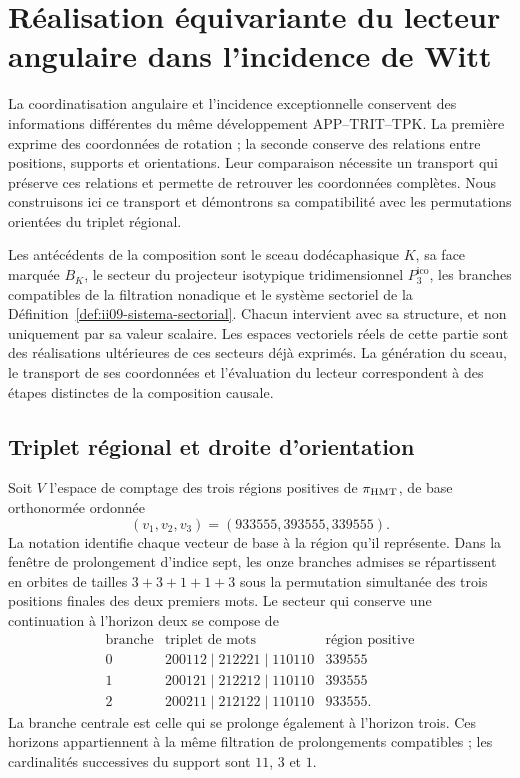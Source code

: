 \section{Réalisation équivariante du lecteur angulaire dans l’incidence de Witt}
\label{sec:ii-enlace-angular-witt}

La coordinatisation angulaire et l’incidence exceptionnelle conservent des informations différentes
du même développement APP--TRIT--TPK. La première exprime des coordonnées de
rotation ; la seconde conserve des relations entre positions, supports et
orientations. Leur comparaison nécessite un transport qui préserve ces
relations et permette de retrouver les coordonnées complètes. Nous construisons ici
ce transport et démontrons sa compatibilité avec les permutations
orientées du triplet régional.

Les antécédents de la composition sont le sceau dodécaphasique \(K\), sa
face marquée \(B_K\), le secteur du projecteur isotypique tridimensionnel
\(P_3^{\mathrm{ico}}\), les branches
compatibles de la filtration nonadique et le système sectoriel de la
Définition~\ref{def:ii09-sistema-sectorial}. Chacun intervient avec sa
structure, et non uniquement par sa valeur scalaire. Les espaces
vectoriels réels de cette partie sont des réalisations ultérieures de ces
secteurs déjà exprimés. La génération du sceau, le transport de ses
coordonnées et l’évaluation du lecteur correspondent à des étapes distinctes de
la composition causale.

\subsection{Triplet régional et droite d’orientation}

Soit \(V\) l’espace de comptage des trois régions positives de
\(\pi_{\rm HMT}\), de base orthonormée ordonnée
\[
 (v_1,v_2,v_3)=(933555,393555,339555).
\]
La notation identifie chaque vecteur de base à la région qu’il représente.
Dans la fenêtre de prolongement d’indice sept, les onze branches admises
se répartissent en orbites de tailles \(3+3+1+1+3\) sous la permutation
simultanée des trois positions finales des deux premiers mots.
Le secteur qui conserve une continuation à l’horizon deux se compose de
\[
\begin{array}{c|c|c}
\text{branche}&\text{triplet de mots}&\text{région positive}\\ \hline
0&200112\mid212221\mid110110&339555\\
1&200121\mid212212\mid110110&393555\\
2&200211\mid212122\mid110110&933555.
\end{array}
\]
La branche centrale est celle qui se prolonge également à l’horizon trois. Ces
horizons appartiennent à la même filtration de prolongements compatibles ;
les cardinalités successives du support sont \(11\), \(3\) et \(1\).

